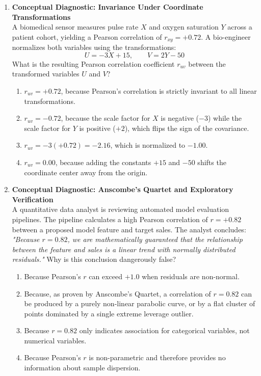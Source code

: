 \begin{enumerate}[resume]
\item \textbf{Conceptual Diagnostic: Invariance Under Coordinate Transformations} \\
A biomedical sensor measures pulse rate $X$ and oxygen saturation $Y$ across a patient cohort, yielding a Pearson correlation of $r_{xy} = +0.72$. A bio-engineer normalizes both variables using the transformations:
$$U = -3X + 15, \qquad V = 2Y - 50$$
What is the resulting Pearson correlation coefficient $r_{uv}$ between the transformed variables $U$ and $V$?
\begin{enumerate}
    \item $r_{uv} = +0.72$, because Pearson's correlation is strictly invariant to all linear transformations.
    \item $r_{uv} = -0.72$, because the scale factor for $X$ is negative ($-3$) while the scale factor for $Y$ is positive ($+2$), which flips the sign of the covariance.
    \item $r_{uv} = -3(+0.72) = -2.16$, which is normalized to $-1.00$.
    \item $r_{uv} = 0.00$, because adding the constants $+15$ and $-50$ shifts the coordinate center away from the origin.
\end{enumerate}

\item \textbf{Conceptual Diagnostic: Anscombe's Quartet and Exploratory Verification} \\
A quantitative data analyst is reviewing automated model evaluation pipelines. The pipeline calculates a high Pearson correlation of $r = +0.82$ between a proposed model feature and target sales. The analyst concludes: \textit{"Because $r = 0.82$, we are mathematically guaranteed that the relationship between the feature and sales is a linear trend with normally distributed residuals."} Why is this conclusion dangerously false?
\begin{enumerate}
    \item Because Pearson's $r$ can exceed $+1.0$ when residuals are non-normal.
    \item Because, as proven by Anscombe's Quartet, a correlation of $r = 0.82$ can be produced by a purely non-linear parabolic curve, or by a flat cluster of points dominated by a single extreme leverage outlier.
    \item Because $r = 0.82$ only indicates association for categorical variables, not numerical variables.
    \item Because Pearson's $r$ is non-parametric and therefore provides no information about sample dispersion.
\end{enumerate}
\end{enumerate}
